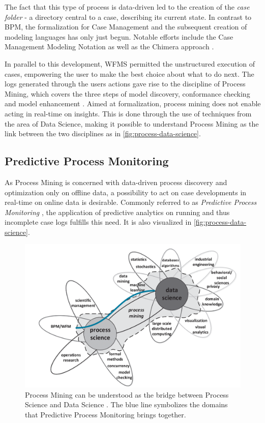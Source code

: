 The fact that this type of process is data-driven led to the creation of the \textit{case folder} - a directory central to a case, describing its current state. In contrast to BPM, the formalization for Case Management and the subsequent creation of modeling languages has only just begun. Notable efforts include the Case Management Modeling Notation \cite{web:cmmn} as well as the Chimera approach \cite{hewelt2016}.

In parallel to this development, WFMS permitted the unstructured execution of cases, empowering the user to make the best choice about what to do next. The logs generated through the users actions gave rise to the discipline of Process Mining, which covers the three steps of model discovery, conformance checking and model enhancement \cite{Aalst2016}. Aimed at formalization, process mining does not enable acting in real-time on insights. This is done through the use of techniques from the area of Data Science, making it possible to understand Process Mining as the link between the two disciplines as in \autoref{fig:process-data-science}.

\subsection{Predictive Process Monitoring}
As Process Mining is concerned with data-driven process discovery and optimization only on offline data, a possibility to act on case developments in real-time on online data is desirable. Commonly referred to as \textit{Predictive Process Monitoring} \cite{francescomarino2015, schoenig2018}, the application of predictive analytics on running and thus incomplete case logs fulfills this need. It is also visualized in \autoref{fig:process-data-science}.

\begin{figure}
    \centering
    \includegraphics[width=\textwidth]{gfx/process-data-science.png}
    \caption{Process Mining can be understood as the bridge between Process Science and Data Science \cite[p.18]{Aalst2016}. The blue line symbolizes the domains that Predictive Process Monitoring brings together.}
    \label{fig:process-data-science}
\end{figure}

